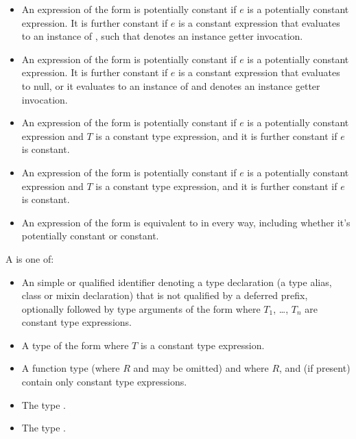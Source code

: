 \documentclass[makeidx]{article}
\begin{document}
{\begin{itemize}
\item An expression of the form  is potentially constant
  if $e$ is a potentially constant expression.
  It is further constant if $e$ is a constant expression that
  evaluates to an instance of ,
  such that  denotes an instance getter invocation.

\item An expression of the form  is potentially constant
  if $e$ is a potentially constant expression.
  It is further constant if $e$ is a constant expression that
  evaluates to null, or it evaluates to an instance of 
  and  denotes an instance getter invocation.

\item An expression of the form  is potentially constant
  if $e$ is a potentially constant expression
  and $T$ is a constant type expression,
  and it is further constant if $e$ is constant.

\item An expression of the form  is potentially constant
  if $e$ is a potentially constant expression
  and $T$ is a constant type expression,
  and it is further constant if $e$ is constant.

\item
  An expression of the form 
  is equivalent to  in every way,
  including whether it's potentially constant or constant.
\end{itemize}

\LMHash{}%
A
is one of:

\begin{itemize}
\item
  An simple or qualified identifier
  denoting a type declaration (a type alias, class or mixin declaration)
  that is not qualified by a deferred prefix,
  optionally followed by type arguments of the form
  where $T_1$, \ldots, $T_n$ are constant type expressions.
\item
  A type of the form 
  where $T$ is a constant type expression.
\item
  A function type
  (where $R$ and  may be omitted)
  and where $R$,  and 
  (if present) contain only constant type expressions.
\item
  The type \VOID.
\item
  The type \DYNAMIC.
\end{itemize}

}
\end{document}
